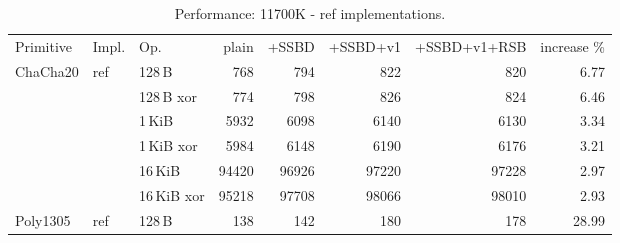 
\setlength{\tabcolsep}{4pt}
\begin{table}[H]
    \caption{Performance: 11700K - ref implementations.}
    \label{tab:results:all:11700K:ref}
  \begin{tabular}{lllrrrrr}
  \toprule
    Primitive
 & Impl. & Op.          & plain & +SSBD & +SSBD+v1 & +SSBD+v1+RSB & increase \% \\

    \multirow{6}{*}{ChaCha20}
 &  \multirow{6}{*}{ref}
       & 128\,B         & 768
                        & 794
                        & 822
                        & 820
                        & 6.77 \\

 &     & 128\,B xor     & 774
                        & 798
                        & 826
                        & 824
                        & 6.46 \\

 &     & 1\,KiB         & 5932
                        & 6098
                        & 6140
                        & 6130
                        & 3.34 \\

 &     & 1\,KiB xor     & 5984
                        & 6148
                        & 6190
                        & 6176
                        & 3.21 \\

 &     & 16\,KiB        & 94420
                        & 96926
                        & 97220
                        & 97228
                        & 2.97 \\

 &     & 16\,KiB xor    & 95218
                        & 97708
                        & 98066
                        & 98010
                        & 2.93 \\

     \midrule
    \multirow{6}{*}{Poly1305}
 &  \multirow{6}{*}{ref}
       & 128\,B         & 138
                        & 142
                        & 180
                        & 178
                        & 28.99 \\


\end{tabular}
\end{table}
